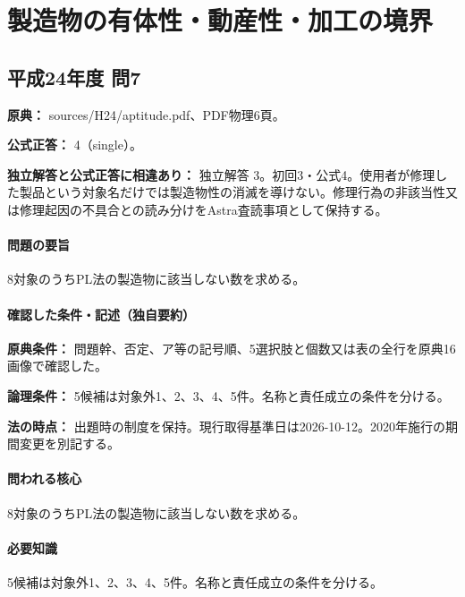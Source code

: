 \section{製造物の有体性・動産性・加工の境界}

\subsection{平成24年度 問7}
\label{q:h24-reg-apt-07}

\noindent\textbf{原典：} sources/H24/aptitude.pdf、PDF物理6頁。

\textbf{公式正答：} 4（single）。

\par\textbf{独立解答と公式正答に相違あり：} 独立解答 3。初回3・公式4。使用者が修理した製品という対象名だけでは製造物性の消滅を導けない。修理行為の非該当性又は修理起因の不具合との読み分けをAstra査読事項として保持する。

\paragraph{問題の要旨} 8対象のうちPL法の製造物に該当しない数を求める。

\paragraph{確認した条件・記述（独自要約）}\mbox{}\par

\noindent\textbf{原典条件：} 問題幹、否定、ア等の記号順、5選択肢と個数又は表の全行を原典16画像で確認した。\par

\noindent\textbf{論理条件：} 5候補は対象外1、2、3、4、5件。名称と責任成立の条件を分ける。\par

\noindent\textbf{法の時点：} 出題時の制度を保持。現行取得基準日は2026-10-12。2020年施行の期間変更を別記する。\par

\paragraph{問われる核心} 8対象のうちPL法の製造物に該当しない数を求める。

\paragraph{必要知識} 5候補は対象外1、2、3、4、5件。名称と責任成立の条件を分ける。

